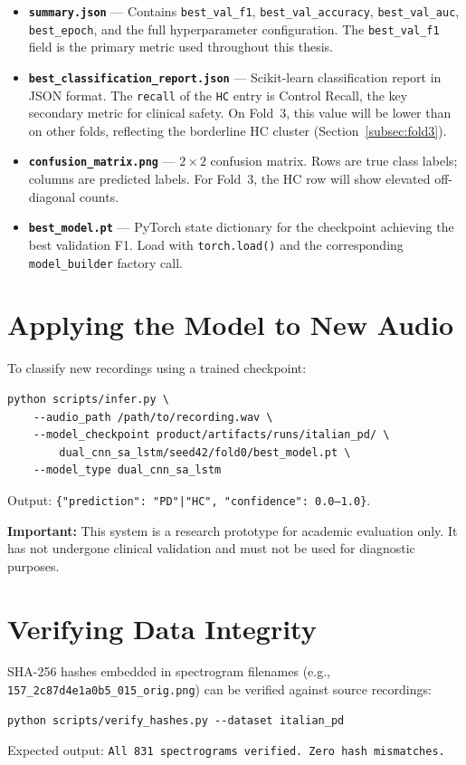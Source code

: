 \documentclass[oneside,openany]{final_report}
\begin{document}
\begin{itemize}
    \item \textbf{\texttt{summary.json}} --- Contains \texttt{best\_val\_f1}, \texttt{best\_val\_accuracy}, \texttt{best\_val\_auc}, \texttt{best\_epoch}, and the full hyperparameter configuration. The \texttt{best\_val\_f1} field is the primary metric used throughout this thesis.
    \item \textbf{\texttt{best\_classification\_report.json}} --- Scikit-learn classification report in JSON format. The \texttt{recall} of the \texttt{HC} entry is Control Recall, the key secondary metric for clinical safety. On Fold~3, this value will be lower than on other folds, reflecting the borderline HC cluster (Section~\ref{subsec:fold3}).
    \item \textbf{\texttt{confusion\_matrix.png}} --- $2 \times 2$ confusion matrix. Rows are true class labels; columns are predicted labels. For Fold~3, the HC row will show elevated off-diagonal counts.
    \item \textbf{\texttt{best\_model.pt}} --- PyTorch state dictionary for the checkpoint achieving the best validation F1. Load with \texttt{torch.load()} and the corresponding \texttt{model\_builder} factory call.
\end{itemize}

\section{Applying the Model to New Audio}

To classify new recordings using a trained checkpoint:
\begin{verbatim}
python scripts/infer.py \
    --audio_path /path/to/recording.wav \
    --model_checkpoint product/artifacts/runs/italian_pd/ \
        dual_cnn_sa_lstm/seed42/fold0/best_model.pt \
    --model_type dual_cnn_sa_lstm
\end{verbatim}
Output: \texttt{\{"prediction": "PD"|"HC", "confidence": 0.0--1.0\}}.

\textbf{Important:} This system is a research prototype for academic evaluation only. It has not undergone clinical validation and must not be used for diagnostic purposes.

\section{Verifying Data Integrity}

SHA-256 hashes embedded in spectrogram filenames (e.g., \texttt{157\_2c87d4e1a0b5\_015\_orig.png}) can be verified against source recordings:
\begin{verbatim}
python scripts/verify_hashes.py --dataset italian_pd
\end{verbatim}
Expected output: \texttt{All 831 spectrograms verified. Zero hash mismatches.}
\end{document}
